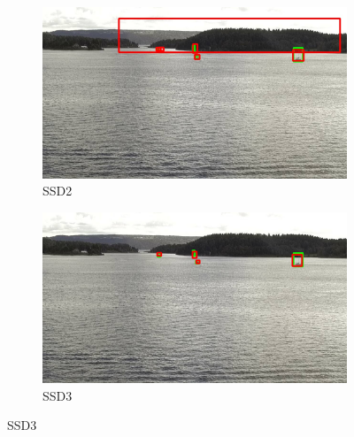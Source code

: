 \begin{figure}[h!]
\begin{subfigure}{.5\textwidth}
  \centering
  \includegraphics[width=0.9\linewidth]{results/case_buildings/bigbox_bcbf/SSD2/selected_08_04_frame3470.jpg}
  \caption{SSD2}
  \label{fig:sfig1}
\end{subfigure}%
\begin{subfigure}{.5\textwidth}
  \centering
  \includegraphics[width=.9\linewidth]{results/case_buildings/bigbox_bcbf/SSD3/selected_08_04_frame3470.jpg}
  \caption{SSD3}
  \label{fig:sfig2}
\end{subfigure}


\end{figure}
